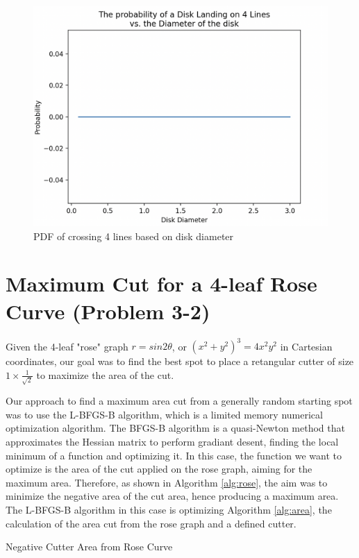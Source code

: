 \documentclass{article}
\begin{document}
\begin{figure}[hbt!]
    \centering
    \includegraphics[width=0.95\linewidth]{images/l4.png}
    \caption{PDF of crossing 4 lines based on disk diameter}
    \label{fig:l4}
\end{figure}




\section{Maximum Cut for a 4-leaf Rose Curve (Problem 3-2)}
Given the 4-leaf "rose" graph $r=sin2\theta$, or $(x^2+y^2)^3=4x^2y^2$ in Cartesian coordinates, our goal was to find the best spot to place a retangular cutter of size $1 \times \frac{1}{\sqrt{2}}$ to maximize the area of the cut. 

Our approach to find a maximum area cut from a generally random starting spot was to use the L-BFGS-B algorithm, which is a limited memory numerical optimization algorithm. The BFGS-B algorithm is a quasi-Newton method that approximates the Hessian matrix to perform gradiant desent, finding the local minimum of a function and optimizing it. In this case, the function we want to optimize is the area of the cut applied on the rose graph, aiming for the maximum area. Therefore, as shown in Algorithm \ref{alg:rose}, the aim was to minimize the negative area of the cut area, hence producing a maximum area. The L-BFGS-B algorithm in this case is optimizing Algorithm \ref{alg:area}, the calculation of the area cut from the rose graph and a defined cutter.

\begin{algorithm}
    \caption{Negative Cutter Area from Rose Curve}\label{alg:area}
\end{algorithm}
\end{document}
